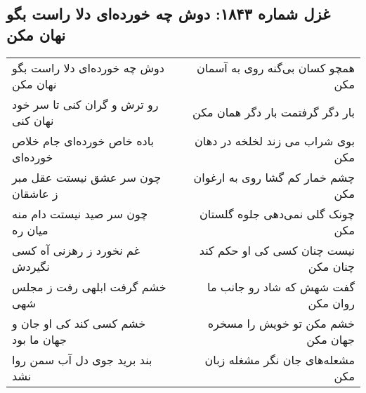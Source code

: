\begin{center}
\section*{غزل شماره ۱۸۴۳: دوش چه خورده‌ای دلا راست بگو نهان مکن}
\label{sec:1843}
\begin{longtable}{l p{0.5cm} r}
دوش چه خورده‌ای دلا راست بگو نهان مکن
&&
همچو کسان بی‌گنه روی به آسمان مکن
\\
رو ترش و گران کنی تا سر خود نهان کنی
&&
بار دگر گرفتمت بار دگر همان مکن
\\
باده خاص خورده‌ای جام خلاص خورده‌ای
&&
بوی شراب می زند لخلخه در دهان مکن
\\
چون سر عشق نیستت عقل مبر ز عاشقان
&&
چشم خمار کم گشا روی به ارغوان مکن
\\
چون سر صید نیستت دام منه میان ره
&&
چونک گلی نمی‌دهی جلوه گلستان مکن
\\
غم نخورد ز رهزنی آه کسی نگیردش
&&
نیست چنان کسی کی او حکم کند چنان مکن
\\
خشم گرفت ابلهی رفت ز مجلس شهی
&&
گفت شهش که شاد رو جانب ما روان مکن
\\
خشم کسی کند کی او جان و جهان ما بود
&&
خشم مکن تو خویش را مسخره جهان مکن
\\
بند برید جوی دل آب سمن روا نشد
&&
مشعله‌های جان نگر مشغله زبان مکن
\\
\end{longtable}
\end{center}
